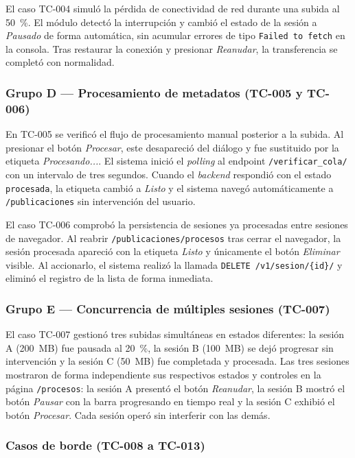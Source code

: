 El caso TC-004 simuló la pérdida de conectividad de red durante una subida al 50~\%. El módulo
detectó la interrupción y cambió el estado de la sesión a \textit{Pausado} de forma automática, sin
acumular errores de tipo \texttt{Failed to fetch} en la consola. Tras restaurar la conexión y
presionar \textit{Reanudar}, la transferencia se completó con normalidad.

\subsubsection*{Grupo D — Procesamiento de metadatos (TC-005 y TC-006)}

En TC-005 se verificó el flujo de procesamiento manual posterior a la subida. Al presionar el botón
\textit{Procesar}, este desapareció del diálogo y fue sustituido por la etiqueta
\textit{Procesando...}. El sistema inició el \textit{polling} al endpoint \texttt{/verificar\_cola/}
con un intervalo de tres segundos. Cuando el \textit{backend} respondió con el estado
\texttt{procesada}, la etiqueta cambió a \textit{Listo} y el sistema navegó automáticamente a
\texttt{/publicaciones} sin intervención del usuario.

El caso TC-006 comprobó la persistencia de sesiones ya procesadas entre sesiones de navegador. Al
reabrir \texttt{/publicaciones/procesos} tras cerrar el navegador, la sesión procesada apareció con
la etiqueta \textit{Listo} y únicamente el botón \textit{Eliminar} visible. Al accionarlo, el
sistema realizó la llamada \texttt{DELETE /v1/sesion/\{id\}/} y eliminó el registro de la lista de
forma inmediata.

\subsubsection*{Grupo E — Concurrencia de múltiples sesiones (TC-007)}

El caso TC-007 gestionó tres subidas simultáneas en estados diferentes: la sesión A (200~MB) fue
pausada al 20~\%, la sesión B (100~MB) se dejó progresar sin intervención y la sesión C (50~MB) fue
completada y procesada. Las tres sesiones mostraron de forma independiente sus respectivos estados y
controles en la página \texttt{/procesos}: la sesión A presentó el botón \textit{Reanudar}, la
sesión B mostró el botón \textit{Pausar} con la barra progresando en tiempo real y la sesión C
exhibió el botón \textit{Procesar}. Cada sesión operó sin interferir con las demás.

\subsubsection*{Casos de borde (TC-008 a TC-013)}

